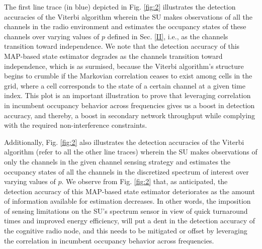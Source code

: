 \documentclass[10pt,twocolumn]{IEEEtran}
\begin{document}
The first line trace (in blue) depicted in Fig. \ref{fig:2} illustrates the detection accuracies of the Viterbi algorithm wherein the SU makes observations of all the channels in the radio environment and estimates the occupancy states of these channels over varying values of $p$ defined in Sec. \ref{II}, i.e., as the channels transition toward independence. We note that the detection accuracy of this MAP-based state estimator degrades as the channels transition toward independence, which is as surmised, because the Viterbi algorithm's structure begins to crumble if the Markovian correlation ceases to exist among cells in the grid, where a cell corresponds to the state of a certain channel at a given time index. This plot is an important illustration to prove that leveraging correlation in incumbent occupancy behavior across frequencies gives us a boost in detection accuracy, and thereby, a boost in secondary network throughput while complying with the required non-interference constraints.

Additionally, Fig. \ref{fig:2} also illustrates the detection accuracies of the Viterbi algorithm (refer to all the other line traces) wherein the SU makes observations of only the channels in the given channel sensing strategy and estimates the occupancy states of all the channels in the discretized spectrum of interest over varying values of $p$. We observe from Fig. \ref{fig:2} that, as anticipated, the detection accuracy of this MAP-based state estimator deteriorates as the amount of information available for estimation decreases. In other words, the imposition of sensing limitations on the SU's spectrum sensor in view of quick turnaround times and improved energy efficiency, will put a dent in the detection accuracy of the cognitive radio node, and this needs to be mitigated or offset by leveraging the correlation in incumbent occupancy behavior across frequencies.
\end{document}
